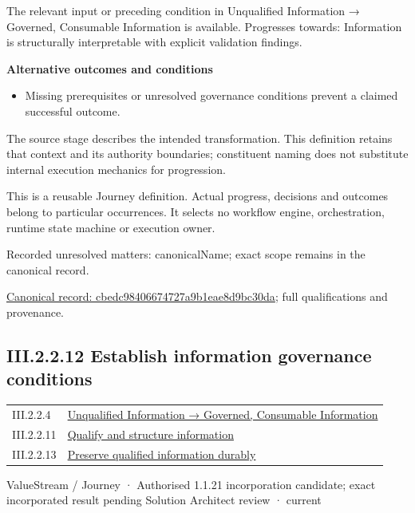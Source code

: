 The relevant input or preceding condition in Unqualified Information → Governed, Consumable Information is available. Progresses towards: Information is structurally interpretable with explicit validation findings.



\par\medskip\textbf{Alternative outcomes and conditions}\par


\begin{itemize}


\item Missing prerequisites or unresolved governance conditions prevent a claimed successful outcome.

\end{itemize}


The source stage describes the intended transformation. This definition retains that context and its authority boundaries; constituent naming does not substitute internal execution mechanics for progression.



This is a reusable Journey definition. Actual progress, decisions and outcomes belong to particular occurrences. It selects no workflow engine, orchestration, runtime state machine or execution owner.


{\small Recorded unresolved matters: canonicalName; exact scope remains in the canonical record.}\par
{\footnotesize \href{../../../../continuum/strategy/value-stream/cbedc98406674727a9b1eae8d9bc30da.md}{Canonical record: cbedc98406674727a9b1eae8d9bc30da}; full qualifications and provenance.}\par
\subsection*{III.2.2.12 Establish information governance conditions}
\label{navigation:III.2.2.12}

\begin{longtable}{p{.22\linewidth}p{.73\linewidth}}
III.2.2.4 & \hyperref[element:02e036f18bab400bac261007e39457ee]{Unqualified Information → Governed, Consumable Information} \\
III.2.2.11 & \hyperref[element:cbedc98406674727a9b1eae8d9bc30da]{Qualify and structure information} \\
III.2.2.13 & \hyperref[element:e07ef0bcd9444af3a22ab45bbb3afc38]{Preserve qualified information durably} \\
\end{longtable}
\label{element:ae90f7118fe245659f4524fc8991614d}
{\small ValueStream / Journey · Authorised 1.1.21 incorporation candidate; exact incorporated result pending Solution Architect review · current}\par

